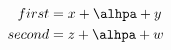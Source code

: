 \documentclass{article}
\begin{document}
\begin{align*}
first &= x+\alhpa+y \\
second &= z+\alhpa+w
\end{align*}
\end{document}
